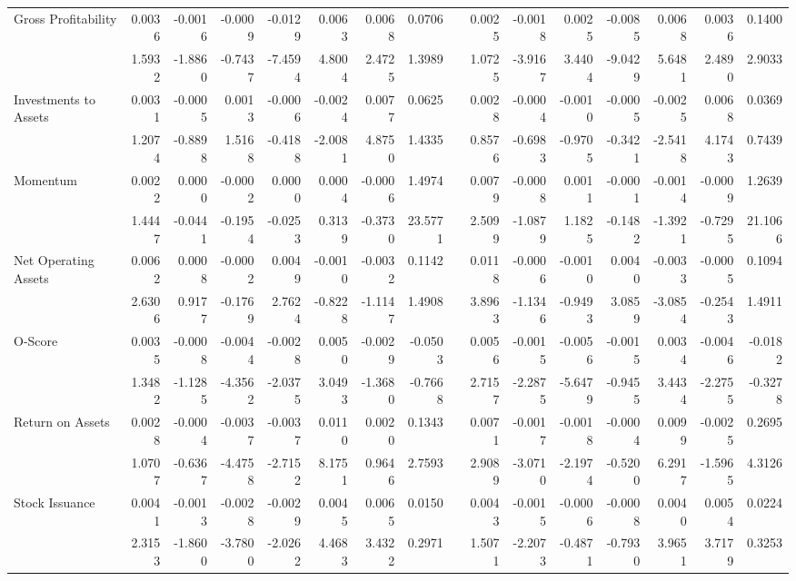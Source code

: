 \begin{table}[h]
{\begin{tabular}{lrrrrrrrrrrrrrrr}
Gross Profitability & 0.0036 & -0.0016 & -0.0009 & -0.0129 & 0.0063 & 0.0068 & 0.0706 &       & 0.0025 & -0.0018 & 0.0025 & -0.0085 & 0.0068 & 0.0036 & 0.1400 \\
& 1.5932 & -1.8860 & -0.7437 & -7.4594 & 4.8004 & 2.4725 & 1.3989 &       & 1.0725 & -3.9167 & 3.4404 & -9.0429 & 5.6481 & 2.4890 & 2.9033 \\
Investments to Assets & 0.0031 & -0.0005 & 0.0013 & -0.0006 & -0.0024 & 0.0077 & 0.0625 &       & 0.0028 & -0.0004 & -0.0010 & -0.0005 & -0.0025 & 0.0068 & 0.0369 \\
& 1.2074 & -0.8898 & 1.5168 & -0.4188 & -2.0081 & 4.8750 & 1.4335 &       & 0.8576 & -0.6983 & -0.9705 & -0.3421 & -2.5418 & 4.1743 & 0.7439 \\
Momentum & 0.0022 & 0.0000 & -0.0002 & 0.0000 & 0.0004 & -0.0006 & 1.4974 &       & 0.0079 & -0.0008 & 0.0011 & -0.0001 & -0.0014 & -0.0009 & 1.2639 \\
& 1.4447 & -0.0441 & -0.1954 & -0.0253 & 0.3139 & -0.3730 & 23.5771 &       & 2.5099 & -1.0879 & 1.1825 & -0.1482 & -1.3921 & -0.7295 & 21.1066 \\
Net Operating Assets & 0.0062 & 0.0008 & -0.0002 & 0.0049 & -0.0010 & -0.0032 & 0.1142 &       & 0.0118 & -0.0006 & -0.0010 & 0.0040 & -0.0033 & -0.0005 & 0.1094 \\
& 2.6306 & 0.9177 & -0.1769 & 2.7624 & -0.8228 & -1.1147 & 1.4908 &       & 3.8963 & -1.1346 & -0.9493 & 3.0859 & -3.0854 & -0.2543 & 1.4911 \\
O-Score & 0.0035 & -0.0008 & -0.0044 & -0.0028 & 0.0050 & -0.0029 & -0.0503 &       & 0.0056 & -0.0015 & -0.0056 & -0.0015 & 0.0034 & -0.0046 & -0.0182 \\
& 1.3482 & -1.1285 & -4.3562 & -2.0375 & 3.0493 & -1.3680 & -0.7668 &       & 2.7157 & -2.2875 & -5.6479 & -0.9455 & 3.4434 & -2.2755 & -0.3278 \\
Return on Assets & 0.0028 & -0.0004 & -0.0037 & -0.0037 & 0.0110 & 0.0020 & 0.1343 &       & 0.0071 & -0.0017 & -0.0018 & -0.0004 & 0.0099 & -0.0025 & 0.2695 \\
& 1.0707 & -0.6367 & -4.4758 & -2.7152 & 8.1751 & 0.9646 & 2.7593 &       & 2.9089 & -3.0710 & -2.1974 & -0.5200 & 6.2917 & -1.5965 & 4.3126 \\
Stock Issuance & 0.0041 & -0.0013 & -0.0028 & -0.0029 & 0.0045 & 0.0065 & 0.0150 &       & 0.0043 & -0.0015 & -0.0006 & -0.0008 & 0.0040 & 0.0054 & 0.0224 \\
& 2.3153 & -1.8600 & -3.7800 & -2.0262 & 4.4683 & 3.4322 & 0.2971 &       & 1.5071 & -2.2073 & -0.4871 & -0.7930 & 3.9651 & 3.7179 & 0.3253 \\
\bottomrule
\end{tabular}%
}
\label{tab:liq-ff6}%
\end{table}%

